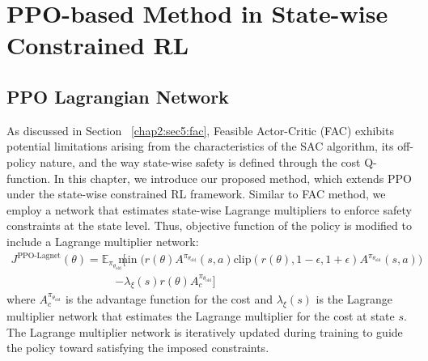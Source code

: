 
\chapter{PPO-based Method in State-wise Constrained RL}\label{chapter3}

\section{PPO Lagrangian Network}

As discussed in Section ~\ref{chap2:sec5:fac}, Feasible Actor-Critic (FAC) exhibits potential limitations arising from the characteristics of the SAC algorithm, its off-policy nature, and the way state-wise safety is defined through the cost Q-function.
In this chapter, we introduce our proposed method, which extends PPO under the state-wise constrained RL framework.
Similar to FAC method, we employ a network that estimates state-wise Lagrange multipliers to enforce safety constraints at the state level.
Thus, objective function of the policy is modified to include a Lagrange multiplier network:
\begin{equation} \label{chap3:eq:ppo_lagnet}
  \begin{aligned}
    J^{\text{PPO-Lagnet}}(\theta) = \mathbb{E}_{\pi_{\theta_\text{old}}} \Big[ &\min \big( r(\theta) A^{\pi_{\theta_\text{old}}}(s, a) \text{clip}(r(\theta), 1 - \epsilon, 1 + \epsilon) A^{\pi_{\theta_\text{old}}}(s, a) \big) \\
    &- \lambda_\xi(s) r(\theta) A^{\pi_{\theta_\text{old}}}_c \Big]
  \end{aligned}
\end{equation}
where $A^{\pi_{\theta_\text{old}}}_c$ is the advantage function for the cost and $\lambda_\xi(s)$ is the Lagrange multiplier network that estimates the Lagrange multiplier for the cost at state $s$.
The Lagrange multiplier network is iteratively updated during training to guide the policy toward satisfying the imposed constraints.
